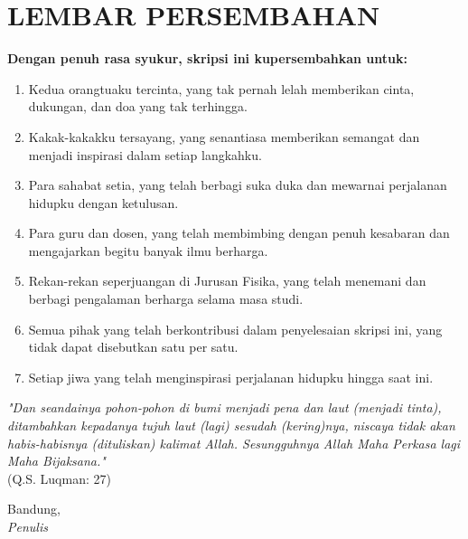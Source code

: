 \chapter*{LEMBAR PERSEMBAHAN}

\noindent
\textbf{Dengan penuh rasa syukur, skripsi ini kupersembahkan untuk:} \\
\begin{enumerate}
    \setlength{\leftmargin}{0.5cm}
    \setlength{\itemindent}{-0.5cm}
    \item Kedua orangtuaku tercinta, yang tak pernah lelah memberikan cinta, dukungan, dan doa yang tak terhingga.
    \item Kakak-kakakku tersayang, yang senantiasa memberikan semangat dan menjadi inspirasi dalam setiap langkahku.
    \item Para sahabat setia, yang telah berbagi suka duka dan mewarnai perjalanan hidupku dengan ketulusan.
    \item Para guru dan dosen, yang telah membimbing dengan penuh kesabaran dan mengajarkan begitu banyak ilmu berharga.
    \item Rekan-rekan seperjuangan di Jurusan Fisika, yang telah menemani dan berbagi pengalaman berharga selama masa studi.
    \item Semua pihak yang telah berkontribusi dalam penyelesaian skripsi ini, yang tidak dapat disebutkan satu per satu.
    \item Setiap jiwa yang telah menginspirasi perjalanan hidupku hingga saat ini.
\end{enumerate}

\begin{center}
\textit{"Dan seandainya pohon-pohon di bumi menjadi pena dan laut (menjadi tinta), ditambahkan kepadanya tujuh laut (lagi) sesudah (kering)nya, niscaya tidak akan habis-habisnya (dituliskan) kalimat Allah. Sesungguhnya Allah Maha Perkasa lagi Maha Bijaksana."} \\
(Q.S. Luqman: 27)
\end{center}


\begin{flushright}
    Bandung, \bulan \\
    \vspace{1.5cm}  %
    \textit{Penulis}  %
\end{flushright}
